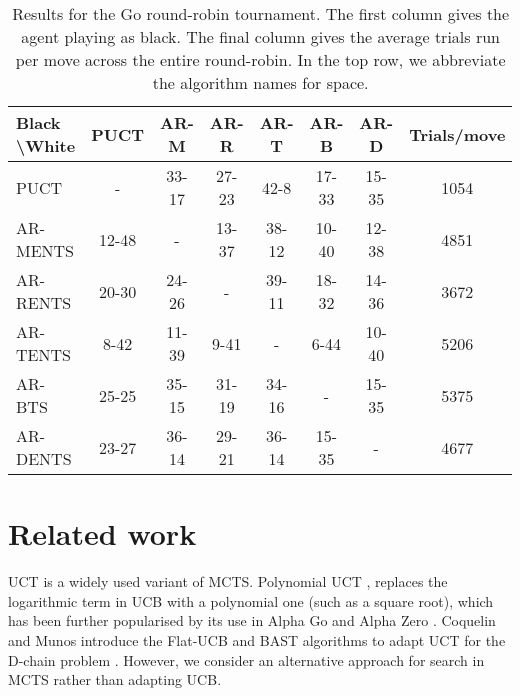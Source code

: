 \documentclass{article}
\theoremstyle{plain}
\begin{document}
          	

        \begin{table*}[]
        \centering   
		    \begin{tabular}{l|cccccc|c} 
		        \textbf{Black \textbackslash White}     & PUCT  & AR-M  & AR-R  & AR-T  & AR-B  & AR-D   & Trials/move\\ 
		        \hline
		                                PUCT            &   -   & 33-17 & 27-23 & 42-8  & 17-33 & 15-35  & 1054 \\
		                                AR-MENTS        & 12-48 &   -   & 13-37 & 38-12 & 10-40 & 12-38  & 4851\\
		                                AR-RENTS        & 20-30 & 24-26 &   -   & 39-11 & 18-32 & 14-36  & 3672 \\
		                                AR-TENTS        &  8-42 & 11-39 &  9-41 &   -   &  6-44 & 10-40  & 5206 \\
		                                AR-BTS          & 25-25 & 35-15 & 31-19 & 34-16 &   -   & 15-35  & 5375 \\
		                                AR-DENTS        & 23-27 & 36-14 & 29-21 & 36-14 & 15-35 &   -    & 4677 \\         
		    \end{tabular}
            \caption{Results for the Go round-robin tournament. The first column gives the agent playing as black. The final column gives the average trials run per move across the entire round-robin. In the top row, we abbreviate the algorithm names for space.\label{table:go_results}}
        \end{table*}





\section{Related work}
    
    UCT \cite{kocsis2006uct,kocsis2006improved} is a widely used variant of MCTS. Polynomial UCT \cite{poly_uct2}, replaces the logarithmic term in UCB with a polynomial one (such as a square root), which has been further 
    popularised by its use in 
    Alpha Go and Alpha Zero \cite{silver2016mastering,silver2017mastering,silver2018general}. Coquelin and Munos introduce the Flat-UCB and BAST algorithms to adapt UCT for the D-chain problem \cite{coquelin2007_uct}. 
    However, we consider an alternative approach for search in MCTS rather than adapting UCB.
    
\end{document}
